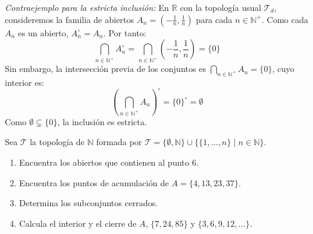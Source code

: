 \begin{sol}
\begin{enumerate}[label=\arabic*)]
        \textit{Contraejemplo para la estricta inclusión:}
        En $\mathbb{R}$ con la topología usual $\mathcal{T}_d$, consideremos la familia de abiertos $A_n = (-\frac{1}{n}, \frac{1}{n})$ para cada $n \in \mathbb{N}^+$.
        Como cada $A_n$ es un abierto, $A_n^\circ = A_n$. Por tanto:
          \[
              \bigcap_{n \in \mathbb{N}^+} A_n^\circ = \bigcap_{n \in \mathbb{N}^+} \left(-\frac{1}{n}, \frac{1}{n}\right) = \{0\}
          \]
        Sin embargo, la intersección previa de los conjuntos es $\bigcap_{n \in \mathbb{N}^+} A_n = \{0\}$, cuyo interior es:
          \[
              \left(\bigcap_{n \in \mathbb{N}^+} A_n\right)^\circ = \{0\}^\circ = \emptyset
          \]
        Como $\emptyset \subsetneq \{0\}$, la inclusión es estricta.
    \end{enumerate}
\end{sol}

\begin{ejer}
    [40] Sea $\mathcal{T}$ la topología de $\mathbb{N}$ formada por $\mathcal{T} = \{\emptyset, \mathbb{N}\} \cup \{\{1, \dots, n\} \mid n \in \mathbb{N}\}$.
    \begin{enumerate}[label=\alph*)]
        \item Encuentra los abiertos que contienen al punto $6$.
        \item Encuentra los puntos de acumulación de $A = \{4, 13, 23, 37\}$.
        \item Determina los subconjuntos cerrados.
        \item Calcula el interior y el cierre de $A$, $\{7, 24, 85\}$ y $\{3, 6, 9, 12, \dots\}$.
    \end{enumerate}
\end{ejer}


